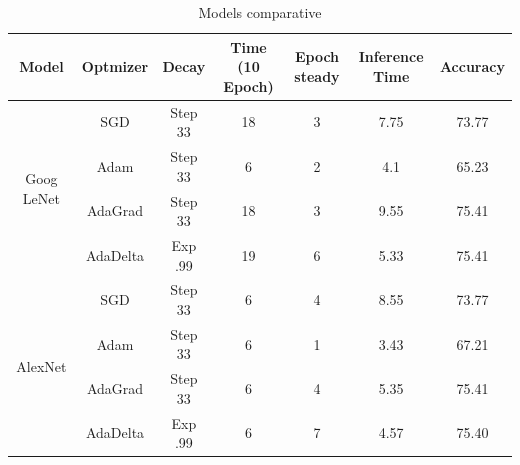 \documentclass[10pt,journal,compsoc]{IEEEtran}
\begin{document}
    \begin{table}[ht]
\caption{Models comparative}
\begin{center}
\begin{tabular}{|c||c c c c c c|}
\hline
  Model & Optmizer & Decay & Time (10 Epoch) & Epoch steady & Inference Time & Accuracy\\

\hline
  \multirow{4}{4em}{Goog LeNet} 
  & SGD & Step 33 & 18 & 3 & 7.75 & 73.77 \\ 
  & Adam & Step 33 & 6 & 2 & 4.1 & 65.23 \\
  & AdaGrad & Step 33 & 18 & 3 & 9.55 & 75.41\\
  & AdaDelta & Exp .99 & 19 & 6 & 5.33 & 75.41\\
\hline
  \multirow{4}{4em}{AlexNet}
  & SGD & Step 33 & 6 & 4 & 8.55 & 73.77 \\ 

  & Adam & Step 33 & 6 & 1 & 3.43 & 67.21 \\
  & AdaGrad & Step 33 & 6 & 4 & 5.35 & 75.41\\
  & AdaDelta & Exp .99 & 6 & 7 & 4.57 & 75.40\\
\hline
\end{tabular}
\label{Tab:result}
\end{center}
\end{table}



\end{document}
